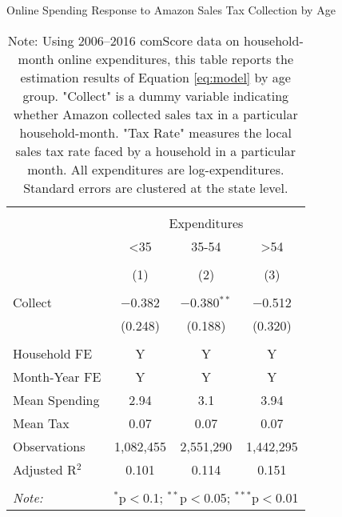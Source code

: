 
\begin{table}[!htbp] \centering
  \caption{Online Spending Response to Amazon Sales Tax Collection by Age}
  \label{tab:appendixSpendingAge}
\begin{tabular}{@{\extracolsep{5pt}}lccc}
\\[-1.8ex]\hline
\hline \\[-1.8ex]
 & \multicolumn{3}{c}{Expenditures} \\
\cline{2-4}
 & <35 & 35-54 & >54 \\
\\[-1.8ex] & (1) & (2) & (3)\\
\hline \\[-1.8ex]
 Collect & $-$0.382 & $-$0.380$^{**}$ & $-$0.512 \\
  & (0.248) & (0.188) & (0.320) \\
 \hline \\[-1.8ex]
Household FE & Y & Y & Y \\
Month-Year FE & Y & Y & Y \\
Mean Spending & 2.94 & 3.1 & 3.94 \\
Mean Tax & 0.07 & 0.07 & 0.07 \\
Observations & 1,082,455 & 2,551,290 & 1,442,295 \\
Adjusted R$^{2}$ & 0.101 & 0.114 & 0.151 \\
\hline
\hline \\[-1.8ex]
\textit{Note:}  & \multicolumn{3}{l}{$^{*}$p$<$0.1; $^{**}$p$<$0.05; $^{***}$p$<$0.01} \\
\end{tabular}
\caption*{Note: Using 2006--2016 comScore data on household-month online expenditures, this table reports the estimation results of Equation \ref{eq:model} by age group. "Collect" is a dummy variable indicating whether Amazon collected sales tax in a particular household-month. "Tax Rate" measures the local sales tax rate faced by a household in a particular month. All expenditures are log-expenditures. Standard errors are clustered at the state level.}
\end{table}
